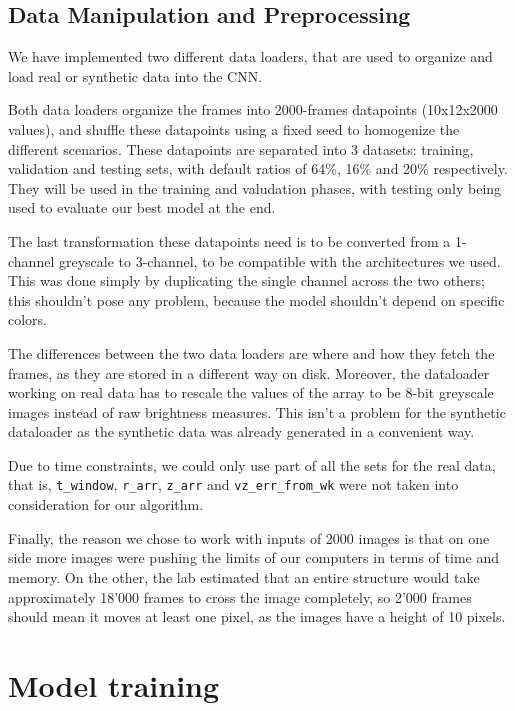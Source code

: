 \documentclass[10pt,conference]{IEEEtran}
\begin{document}
\subsection{Data Manipulation and Preprocessing}
We have implemented two different data loaders, that are used to organize and load real or synthetic data into the CNN.\par
Both data loaders organize the frames into 2000-frames datapoints (10x12x2000 values), and shuffle these datapoints using a fixed seed to homogenize the different scenarios. These datapoints are separated into 3 datasets: training, validation and testing sets, with default ratios of 64\%, 16\% and 20\% respectively. They will be used in the training and valudation phases, with testing only being used to evaluate our best model at the end.\par
The last transformation these datapoints need is to be converted from a 1-channel greyscale to 3-channel, to be compatible with the architectures we used. This was done simply by duplicating the single channel across the two others; this shouldn't pose any problem, because the model shouldn't depend on specific colors.\par
The differences between the two data loaders are where and how they fetch the frames, as they are stored in a different way on disk. Moreover, the dataloader working on real data has to rescale the values of the array to be 8-bit greyscale images instead of raw brightness measures. This isn't a problem for the synthetic dataloader as the synthetic data was already generated in a convenient way.

Due to time constraints, we could only use part of all the sets for the real data, that is, \texttt{t\_window}, \texttt{r\_arr}, \texttt{z\_arr} and \texttt{vz\_err\_from\_wk} were not taken into consideration for our algorithm.\par
Finally, the reason we chose to work with inputs of 2000 images is that on one side more images were pushing the limits of our computers in terms of time and memory. On the other, the lab estimated that an entire structure would take approximately 18'000 frames to cross the image completely, so 2'000 frames should mean it moves at least one pixel, as the images have a height of 10 pixels.\par


\section{Model training}
 
\end{document}
